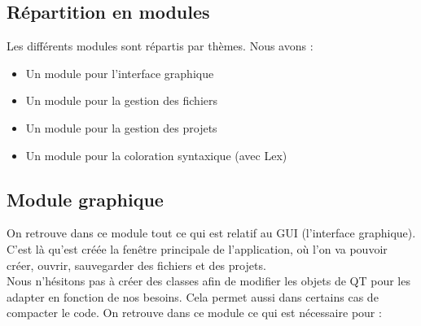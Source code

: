 \documentclass[a4paper,12pt]{article}
\begin{document}
	\subsection{Répartition en modules}
	
		Les différents modules sont répartis par thèmes. Nous avons :
		\begin{itemize}
			\item Un module pour l'interface graphique
			\item Un module pour la gestion des fichiers
			\item Un module pour la gestion des projets
			\item Un module pour la coloration syntaxique (avec Lex)
		\end{itemize}
	
	\subsection{Module graphique}
	
		On retrouve dans ce module tout ce qui est relatif au GUI (l'interface graphique).\\
		C'est là qu'est créée la fenêtre principale de l'application, où l'on va pouvoir créer, ouvrir, sauvegarder des fichiers et des projets.\\
		Nous n'hésitons pas à créer des classes afin de modifier les objets de QT pour les adapter en fonction de nos besoins. Cela permet aussi dans certains cas de compacter le code.
		On retrouve dans ce module ce qui est nécessaire pour :
	
\end{document}
